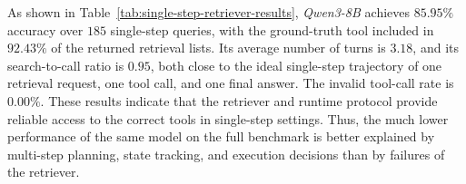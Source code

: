 As shown in Table~\ref{tab:single-step-retriever-results}, \textit{Qwen3-8B} achieves $85.95\%$ accuracy over $185$ single-step queries, with the ground-truth tool included in $92.43\%$ of the returned retrieval lists.
Its average number of turns is $3.18$, and its search-to-call ratio is $0.95$, both close to the ideal single-step trajectory of one retrieval request, one tool call, and one final answer.
The invalid tool-call rate is $0.00\%$.
These results indicate that the retriever and runtime protocol provide reliable access to the correct tools in single-step settings. 
Thus, the much lower performance of the same model on the full benchmark is better explained by multi-step planning, state tracking, and execution decisions than by failures of the retriever.












